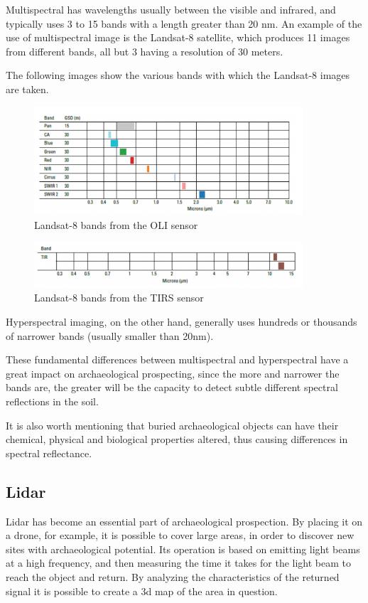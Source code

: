 Multispectral has wavelengths usually between the visible and infrared, and typically uses 3 to 15 bands with a length greater than 20 nm. An example of the use of multispectral image is the Landsat-8 satellite, which produces 11 images from different bands, all but 3 having a resolution of 30 meters.

The following images show the various bands with which the Landsat-8 images are taken.

\begin{figure}[H]
\centering
\includegraphics[width=10cm]{images/landsat1.png}
\caption{Landsat-8 bands from the OLI sensor}
\end{figure}

\begin{figure}[H]
\centering
\includegraphics[width=10cm]{images/landsat2.png}
\caption{Landsat-8 bands from the TIRS sensor}
\end{figure}

Hyperspectral imaging, on the other hand, generally uses hundreds or thousands of narrower bands (usually smaller than 20nm).

These fundamental differences between multispectral and hyperspectral have a great impact on archaeological prospecting, since the more and narrower the bands are, the greater will be the capacity to detect subtle different spectral reflections in the soil.

It is also worth mentioning that buried archaeological objects can have their chemical, physical and biological properties altered, thus causing differences in spectral reflectance.


\subsection{Lidar}
Lidar has become an essential part of archaeological prospection. By placing it on a drone, for example, it is possible to cover large areas, in order to discover new sites with archaeological potential.  Its operation is based on emitting light beams at a high frequency, and then measuring the time it takes for the light beam to reach the object and return.
By analyzing the characteristics of the returned signal it is possible to create a 3d map of the area in question.


